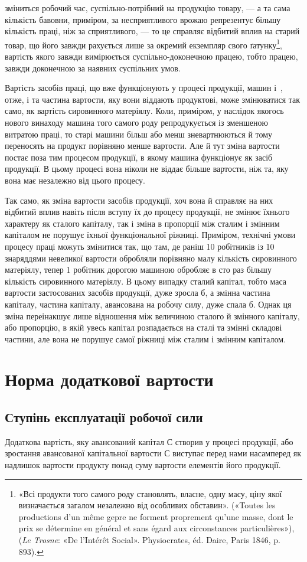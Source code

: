 \parcont{}  %
зміниться робочий час, суспільно-потрібний на продукцію товару, — а та сама кількість бавовни,
приміром, за несприятливого врожаю репрезентує більшу кількість праці, ніж за сприятливого,
— то це справляє відбитий вплив на старий товар, що його завжди рахується лише за окремий екземпляр
свого ґатунку\footnote{«Всі продукти того самого роду становлять, власне, одну масу, ціну якої визначається загалом
незалежно від особливих обставин». («Toutes les productions d’un même gepre ne forment proprement
qu’une masse, dont le prix se détermine en général et sans égard aux circonstances particulières»),
(\emph{Le Trosne}: «De l’Intérêt Social». Physiocrates, éd. Daire,
Paris 1846, p. 893).
},
вартість якого завжди вимірюється суспільно-доконечною працею, тобто працею, завжди доконечною за
наявних суспільних умов.

Вартість засобів праці, що вже функціонують у процесі продукції,
машин і~, отже, і та частина вартости, яку вони віддають продуктові, може змінюватися так
само, як вартість сировинного матеріялу. Коли, приміром, у наслідок якогось нового винаходу машина
того самого роду репродукується із зменшеною витратою праці, то старі машини більш або менш
зневартнюються
й тому переносять на продукт порівняно менше вартости. Але й тут зміна вартости постає поза тим
процесом продукції,
в якому машина функціонує як засіб продукції. В цьому процесі вона ніколи не віддає більше вартости,
ніж та, яку вона має незалежно від цього процесу.

Так само, як зміна вартости засобів продукції, хоч вона й справляє на них відбитий вплив навіть
після вступу їх до процесу продукції, не змінює їхнього характеру як сталого капіталу, так і зміна в
пропорції між сталим і змінним капіталом не порушує їхньої функціональної ріжниці. Приміром,
технічні умови процесу праці можуть змінитися так, що там, де раніш 10 робітників із 10 знаряддями
невеликої вартости обробляли порівняно малу кількість сировинного матеріялу, тепер 1 робітник
дорогою машиною обробляє в сто раз більшу кількість сировинного матеріялу. В цьому випадку сталий
капітал, тобто маса вартости застосованих
засобів продукції, дуже зросла б, а змінна частина капіталу, частина капіталу, авансована на робочу
силу, дуже спала б. Однак ця зміна переінакшує лише відношення між величиною сталого й змінного капіталу, або пропорцію,
в якій увесь капітал розпадається на сталі та змінні складові частини, але вона не
порушує самої ріжниці між сталим і змінним капіталом.

\section{Норма додаткової вартости}
\subsection{Ступінь експлуатації робочої сили}
Додаткова вартість, яку авансований капітал С створив у процесі продукції, або зростання авансованої
капітальної вартости С виступає перед нами насамперед як надлишок вартости
продукту понад суму вартости елементів його продукції.

